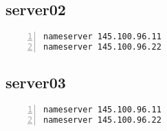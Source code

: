 \documentclass[Configuration]{subfiles}
\begin{document}
\subsection{server02}

\begin{lstlisting}[frame=single,caption=/etc/resolv.conf,backgroundcolor=\color{gray},breaklines=true,numbers=left,]
nameserver 145.100.96.11
nameserver 145.100.96.22
\end{lstlisting}

\subsection{server03}

\begin{lstlisting}[frame=single,caption=/etc/resolv.conf,backgroundcolor=\color{gray},breaklines=true,numbers=left,]
nameserver 145.100.96.11
nameserver 145.100.96.22
\end{lstlisting}
\end{document}
